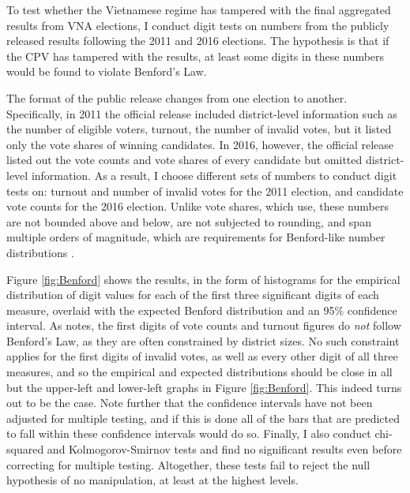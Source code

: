 \documentclass[12pt]{article}
\newcommand{\1}{\mathbbm{1}}
\begin{document}
To test whether the Vietnamese regime has tampered with the final aggregated results from VNA elections, I conduct digit tests on numbers from the publicly released results following the 2011 and 2016 elections. The hypothesis is that if the CPV has tampered with the results, at least some digits in these numbers would be found to violate Benford's Law. 

The format of the public release changes from one election to another. Specifically, in 2011 the official release included district-level information such as the number of eligible voters, turnout, the number of invalid votes, but it listed only the vote shares of winning candidates. In 2016, however, the official release listed out the vote counts and vote shares of every candidate but omitted district-level information. As a result, I choose different sets of numbers to conduct digit tests on: turnout and number of invalid votes for the 2011 election, and candidate vote counts for the 2016 election. Unlike vote shares, which \citet{MaleskySchuler2011} use, these numbers are not bounded above and below, are not subjected to rounding, and span multiple orders of magnitude, which are requirements for Benford-like number distributions \citep{Hill1995, Mebane2006, Berger2015}.

Figure \ref{fig:Benford} shows the results, in the form of histograms for the empirical distribution of digit values for each of the first three significant digits of each measure, overlaid with the expected Benford distribution and an 95\% confidence interval. As \citet{Mebane2006} notes, the first digits of vote counts and turnout figures do \textit{not} follow Benford's Law, as they are often constrained by district sizes. No such constraint applies for the first digits of invalid votes, as well as every other digit of all three measures, and so the empirical and expected distributions should be close in all but the upper-left and lower-left graphs in Figure \ref{fig:Benford}. This indeed turns out to be the case. Note further that the confidence intervals have not been adjusted for multiple testing, and if this is done all of the bars that are predicted to fall within these confidence intervals would do so. Finally, I also conduct chi-squared and Kolmogorov-Smirnov tests and find no significant results even before correcting for multiple testing. Altogether, these tests fail to reject the null hypothesis of no manipulation, at least at the highest levels.
\end{document}
